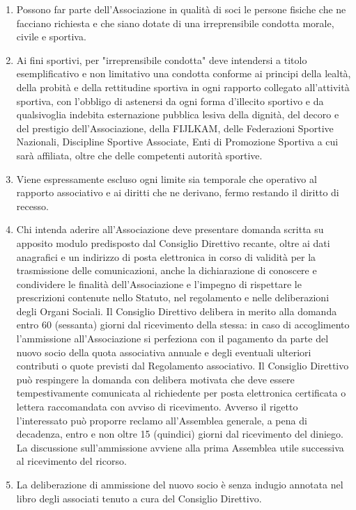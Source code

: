 \documentclass{djtsdoc}
\begin{document}
	\begin{enumerate}
		\item Possono far parte dell'Associazione in qualità di soci le persone fisiche che ne facciano richiesta e che siano dotate di una irreprensibile condotta morale, civile e sportiva.
		\item Ai fini sportivi, per "irreprensibile condotta" deve intendersi a titolo esemplificativo e non limitativo una condotta conforme ai principi della lealtà, della probità e della rettitudine sportiva in ogni rapporto collegato all'attività sportiva, con l'obbligo di astenersi da ogni forma d'illecito sportivo e da qualsivoglia indebita esternazione pubblica lesiva della dignità, del decoro e del prestigio dell'Associazione,  della \mbox{FIJLKAM}, delle Federazioni Sportive Nazionali, Discipline Sportive Associate, Enti di Promozione Sportiva a cui sarà affiliata, oltre che delle competenti autorità sportive.
		\item Viene espressamente escluso ogni limite sia temporale che operativo al rapporto associativo e ai diritti che ne derivano, fermo restando il diritto di recesso.
		\item Chi intenda aderire all'Associazione deve presentare domanda scritta su apposito modulo predisposto dal  Consiglio Direttivo recante, oltre ai dati anagrafici e un indirizzo di posta elettronica  in corso di validità per la trasmissione delle comunicazioni, anche la dichiarazione di conoscere e condividere le finalità dell'Associazione e l'impegno di rispettare le prescrizioni contenute nello Statuto, nel  regolamento e nelle deliberazioni degli Organi Sociali.  Il Consiglio Direttivo delibera in merito alla domanda entro 60 (sessanta) giorni dal ricevimento della stessa: in caso di accoglimento l'ammissione all'Associazione  si perfeziona con il pagamento da parte del nuovo socio della quota associativa annuale e degli eventuali ulteriori contributi o quote previsti dal Regolamento associativo.   Il Consiglio Direttivo può respingere la domanda con delibera motivata che deve essere  tempestivamente comunicata al richiedente per posta elettronica certificata  o lettera raccomandata con avviso di ricevimento. Avverso il rigetto l'interessato può proporre reclamo  all'Assemblea generale, a pena di decadenza, entro e non oltre 15  (quindici) giorni dal ricevimento del diniego. La discussione sull'ammissione avviene alla prima Assemblea utile successiva al ricevimento del ricorso.
		\item La deliberazione di ammissione del nuovo socio è senza indugio annotata nel libro degli associati tenuto a cura del Consiglio Direttivo.

\end{enumerate}
\end{document}
